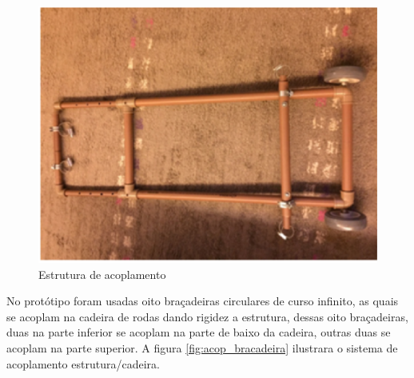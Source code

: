 \begin{figure}[!htb]
\centering
\includegraphics[keepaspectratio=true,scale=0.4]{figuras/resultados/acoplamento}
\caption{Estrutura de acoplamento}
\label{fig:acoplamento}
\end{figure}

No protótipo foram usadas oito braçadeiras circulares de curso infinito, as quais se acoplam na cadeira de rodas dando rigidez a estrutura, dessas oito braçadeiras, duas na parte inferior se acoplam na parte de baixo da cadeira, outras duas se acoplam na parte superior. A figura \ref{fig:acop_bracadeira} ilustrara o sistema de acoplamento estrutura/cadeira.

